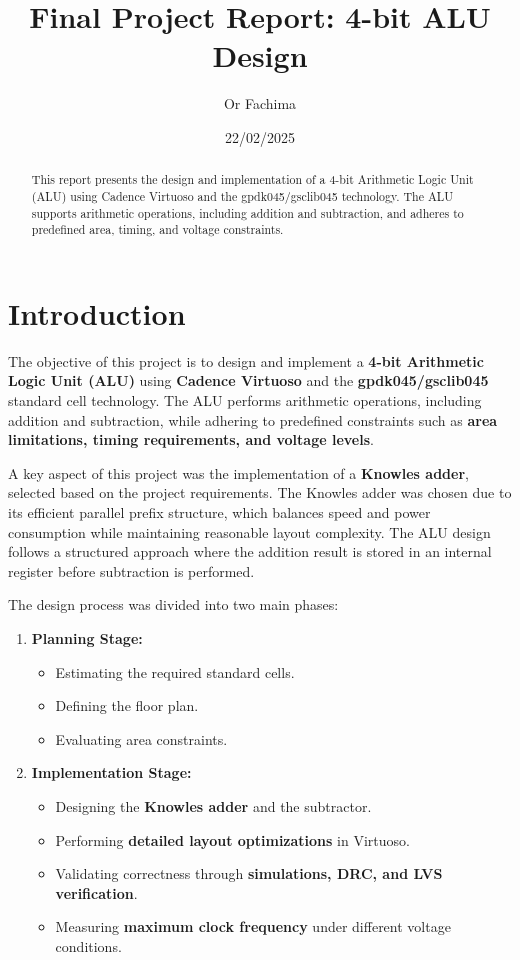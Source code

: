 \documentclass[a4paper,12pt]{article}
\title{Final Project Report: 4-bit ALU Design}
\author{Or Fachima }
\date{22/02/2025}
\begin{document}
\maketitle

\begin{abstract}
This report presents the design and implementation of a 4-bit Arithmetic Logic Unit (ALU) using Cadence Virtuoso and the gpdk045/gsclib045 technology. The ALU supports arithmetic operations, including addition and subtraction, and adheres to predefined area, timing, and voltage constraints.
\end{abstract}
\section{Introduction}
The objective of this project is to design and implement a \textbf{4-bit Arithmetic Logic Unit (ALU)} using \textbf{Cadence Virtuoso} and the \textbf{gpdk045/gsclib045} standard cell technology. The ALU performs arithmetic operations, including addition and subtraction, while adhering to predefined constraints such as \textbf{area limitations, timing requirements, and voltage levels}.

A key aspect of this project was the implementation of a \textbf{Knowles adder}, selected based on the project requirements. The Knowles adder was chosen due to its efficient parallel prefix structure, which balances speed and power consumption while maintaining reasonable layout complexity. The ALU design follows a structured approach where the addition result is stored in an internal register before subtraction is performed.

The design process was divided into two main phases:
\begin{enumerate}
    \item \textbf{Planning Stage:}
    \begin{itemize}
        \item Estimating the required standard cells.
        \item Defining the floor plan.
        \item Evaluating area constraints.
    \end{itemize}
    \item \textbf{Implementation Stage:}
    \begin{itemize}
        \item Designing the \textbf{Knowles adder} and the subtractor.
        \item Performing \textbf{detailed layout optimizations} in Virtuoso.
        \item Validating correctness through \textbf{simulations, DRC, and LVS verification}.
        \item Measuring \textbf{maximum clock frequency} under different voltage conditions.
    \end{itemize}
\end{enumerate}
\end{document}
